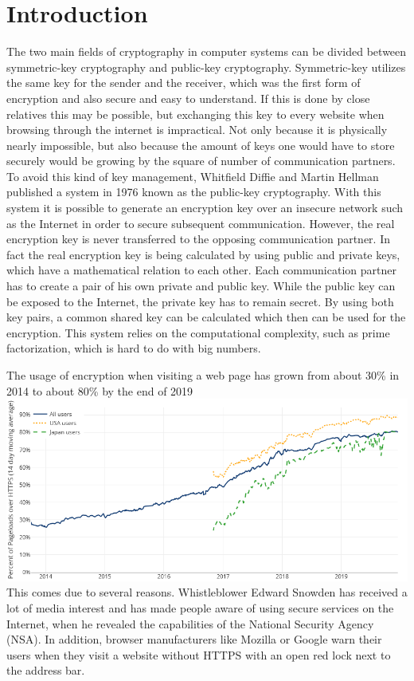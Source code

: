 \documentclass[12pt,twoside,a4paper,parskip]{scrbook}
\begin{document}
\mainmatter

\chapter{Introduction}\label{ch:intro}

The two main fields of cryptography in computer systems can be divided between symmetric-key cryptography and public-key cryptography. Symmetric-key utilizes the same key for the sender and the receiver, which was the first form of encryption and also secure and easy to understand. If this is done by close relatives this may be possible, but exchanging this key to every website when browsing through the internet is impractical. Not only because it is physically nearly impossible, but also because the amount of keys one would have to store securely would be growing by the square of number of communication partners.
To avoid this kind of key management, Whitfield Diffie and Martin Hellman published a system in 1976 known as the public-key cryptography. With this system it is possible to generate an encryption key over an insecure network such as the Internet in order to secure subsequent communication. However, the real encryption key is never transferred to the opposing communication partner. In fact the real encryption key is being calculated by using public and private keys, which have a mathematical relation to each other. Each communication partner has to create a pair of his own private and public key. While the public key can be exposed to the Internet, the private key has to remain secret. 
By using both key pairs, a common shared key can be calculated which then can be used for the encryption. This system relies on the computational complexity, such as prime factorization, which is hard to do with big numbers. 

The usage of encryption when visiting a web page has grown from about 30\% in 2014 to about 80\% by the end of 2019
\includegraphics[Percentage of Web Pages Loaded by Firefox Using HTTPS]{ressources/https_statistics.png}
This comes due to several reasons. Whistleblower Edward Snowden has received a lot of media interest and has made people aware of using secure services on the Internet, when he revealed the capabilities of the National Security Agency (NSA). In addition, browser manufacturers like Mozilla or Google warn their users when they visit a website without HTTPS with an open red lock next to the address bar.
\end{document}
